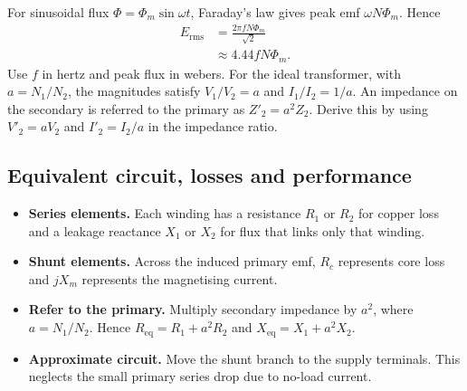 \documentclass[12pt,a4paper]{article}
\begin{document}
For sinusoidal flux \(\Phi=\Phi_m\sin\omega t\), Faraday's law gives peak emf \(\omega N\Phi_m\). Hence
\[
\begin{aligned}
E_{\mathrm{rms}}&=\frac{2\pi fN\Phi_m}{\sqrt 2}\\
                &\approx 4.44 fN\Phi_m .
\end{aligned}
\]
Use \(f\) in hertz and peak flux in webers. For the ideal transformer, with \(a=N_1/N_2\), the magnitudes satisfy \(V_1/V_2=a\) and \(I_1/I_2=1/a\). An impedance on the secondary is referred to the primary as \(Z'_2=a^2Z_2\). Derive this by using \(V'_2=aV_2\) and \(I'_2=I_2/a\) in the impedance ratio.

\subsection{Equivalent circuit, losses and performance}
\begin{itemize}[leftmargin=*, itemsep=3pt, topsep=4pt]
  \item \textbf{Series elements.} Each winding has a resistance \(R_1\) or \(R_2\) for copper loss and a leakage reactance \(X_1\) or \(X_2\) for flux that links only that winding.
  \item \textbf{Shunt elements.} Across the induced primary emf, \(R_c\) represents core loss and \(jX_m\) represents the magnetising current.
  \item \textbf{Refer to the primary.} Multiply secondary impedance by \(a^2\), where \(a=N_1/N_2\). Hence \(R_{\mathrm{eq}}=R_1+a^2R_2\) and \(X_{\mathrm{eq}}=X_1+a^2X_2\).
  \item \textbf{Approximate circuit.} Move the shunt branch to the supply terminals. This neglects the small primary series drop due to no-load current.
\end{itemize}
\end{document}
